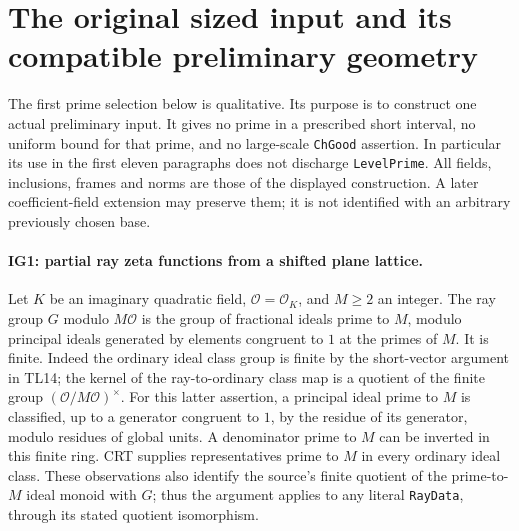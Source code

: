 \section{The original sized input and its compatible preliminary geometry}
\label{sec:initial-geometry}


The first prime selection below is qualitative. Its purpose is to
construct one actual preliminary input. It gives no prime in a
prescribed short interval, no uniform bound for that prime, and no
large-scale \texttt{ChGood} assertion. In particular its use in the
first eleven paragraphs does not discharge \texttt{LevelPrime}.
All fields, inclusions, frames and norms are those of the displayed
construction. A later coefficient-field extension may preserve them;
it is not identified with an arbitrary previously chosen base.

\paragraph{IG1: partial ray zeta functions from a shifted plane lattice.}
Let $K$ be an imaginary quadratic field, $\mathcal O=\mathcal O_K$,
and $M\geq2$ an integer. The ray group $G$ modulo $M\mathcal O$ is
the group of fractional ideals prime to $M$, modulo principal ideals
generated by elements congruent to $1$ at the primes of $M$.
It is finite. Indeed the ordinary ideal class group is finite by the
short-vector argument in TL14; the kernel of the ray-to-ordinary
class map is a quotient of the finite group
$(\mathcal O/M\mathcal O)^\times$. For this latter assertion, a
principal ideal prime to $M$ is classified, up to a generator
congruent to $1$, by the residue of its generator, modulo residues
of global units. A denominator prime to $M$ can be inverted in
this finite ring. CRT supplies representatives prime to $M$ in
every ordinary ideal class. These observations also identify the
source's finite quotient of the prime-to-$M$ ideal monoid with $G$;
thus the argument applies to any literal \texttt{RayData}, through
its stated quotient isomorphism.

